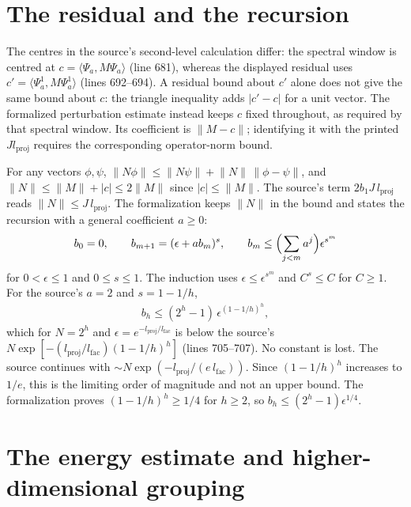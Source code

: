 \documentclass{article}
\begin{document}
\section{The residual and the recursion}

The centres in the source's second-level calculation differ: the spectral
window is centred at $c=\langle\Psi_a,M\Psi_a\rangle$ (line 681), whereas
the displayed residual uses $c'=\langle\Psi^1_a,M\Psi^1_a\rangle$
(lines 692--694). A residual bound about $c'$ alone does not give the same
bound about $c$: the triangle inequality adds $|c'-c|$ for a unit vector.
The formalized perturbation estimate instead keeps $c$ fixed throughout,
as required by that spectral window. Its coefficient is $\lVert M-c\rVert$;
identifying it with the printed $J l_{\mathrm{proj}}$ requires the
corresponding operator-norm bound.

For any vectors $\phi,\psi$,
$\lVert N\phi\rVert\le\lVert N\psi\rVert+\lVert N\rVert\,\lVert\phi-\psi\rVert$,
and $\lVert N\rVert\le\lVert M\rVert+|c|\le2\lVert M\rVert$ since
$|c|\le\lVert M\rVert$. The source's term $2b_1J\,l_{\mathrm{proj}}$ reads
$\lVert N\rVert\le J\,l_{\mathrm{proj}}$. The formalization keeps
$\lVert N\rVert$ in the bound and states the recursion with a general
coefficient $a\ge0$:
\begin{align}\label{eq:hastings05_hierarchical_projection_scalar_recurrence}
    b_0=0,\qquad b_{m+1}=(\epsilon+ab_m)^s,\qquad
    b_m\le\Bigl(\sum_{j<m}a^j\Bigr)\epsilon^{s^m}
\end{align}
for $0<\epsilon\le1$ and $0\le s\le1$. The induction uses
$\epsilon\le\epsilon^{s^m}$ and $C^s\le C$ for $C\ge1$. For the source's $a=2$
and $s=1-1/h$,
\begin{align}\label{eq:hastings05_hierarchical_projection_scalar_recurrence_bound}
    b_h\le(2^h-1)\,\epsilon^{(1-1/h)^h},
\end{align}
which for $N=2^h$ and $\epsilon=e^{-l_{\mathrm{proj}}/l_{\mathrm{fac}}}$ is
below the source's $N\exp[-(l_{\mathrm{proj}}/l_{\mathrm{fac}})(1-1/h)^h]$
(lines 705--707). No constant is lost. The source continues with
$\sim N\exp(-l_{\mathrm{proj}}/(e\,l_{\mathrm{fac}}))$. Since $(1-1/h)^h$
increases to $1/e$, this is the limiting order of magnitude and not an upper
bound. The formalization proves $(1-1/h)^h\ge1/4$ for $h\ge2$, so
$b_h\le(2^h-1)\epsilon^{1/4}$.

\section{The energy estimate and higher-dimensional grouping}
\end{document}
